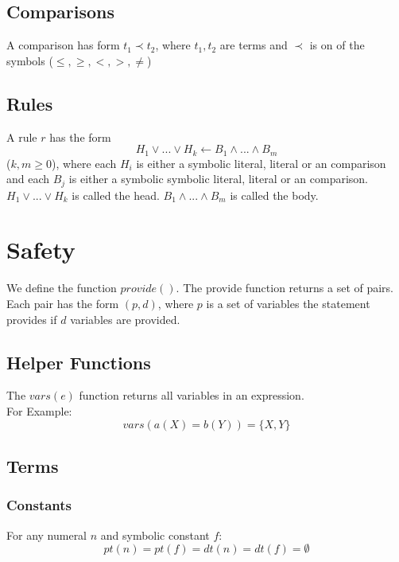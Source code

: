 \documentclass{article}
\newcommand{\set}[1]{\{#1\}}
\begin{document}
	\subsection{Comparisons}

	A comparison has form $t_1 \prec t_2$, where $t_1,t_2$ are terms and $\prec$ is on of the symbols ($\leq,\ge,<,>,\neq$)

	\subsection{Rules}

	A rule $r$ has the form
	\begin{equation}
		H_1 \lor ... \lor H_k  \leftarrow B_1 \land ... \land B_m 
	\end{equation}
	($k, m \ge 0$), where each $H_i$ is either a symbolic literal, literal or an comparison and each $B_j$ is either a symbolic symbolic literal, literal or an comparison.
	$H_1 \lor ... \lor H_k$ is called the head. $B_1 \land ... \land B_m$ is called the body.

	\section{Safety}
	We define the function $\mathit{provide()}$. The provide function returns a set of pairs. Each pair
	has the form $(p, d)$, where $p$ is a set of variables the statement provides if $d$ variables are provided.

	\subsection{Helper Functions}
	The $\mathit{vars(e)}$ function returns all variables in an expression.
	\\ For Example:
	\begin{equation}
		vars(a(X) = b(Y)) = \set{X,Y}
	\end{equation}

	\subsection{Terms}
	\subsubsection{Constants}
	For any numeral $n$ and symbolic constant $f$:
	\begin{equation}
		pt(n) = pt(f) = dt(n) = dt(f) = \emptyset
	\end{equation}
\end{document}
